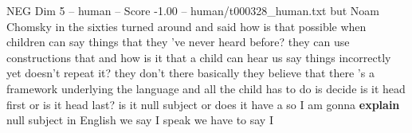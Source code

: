 \begin{textsample}{NEG Dim 5 – human – Score -1.00 – human/t000328\_human.txt}  \label{ex:f5_neg_035}
but Noam Chomsky in the sixties turned around and said how is that possible when children can say things that they 've never heard before? they can use constructions that and how is it that a child can hear us say things incorrectly yet doesn't repeat it? they don't there basically they believe that there 's a framework underlying the language and all the child has to do is decide is it head first or is it head last? is it null subject or does it have a so I am gonna \textbf{explain} null subject in English we say I speak we have to say I

\end{textsample}
